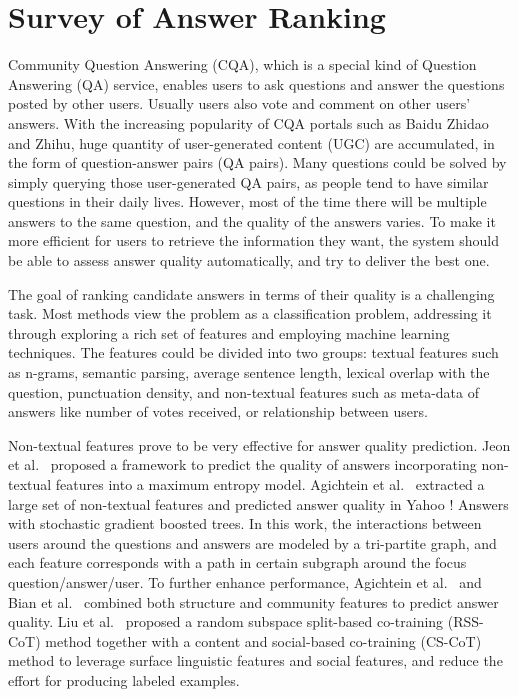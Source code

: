 \section{Survey of Answer Ranking}


Community Question Answering (CQA), which is a special kind of Question Answering (QA) service, enables users to ask questions and answer the questions posted by other users. Usually users also vote and comment on other users' answers. With the increasing popularity of CQA portals such as Baidu Zhidao and Zhihu, huge quantity of user-generated content (UGC) are accumulated, in the form of question-answer pairs (QA pairs). Many questions could be solved by simply querying those user-generated QA pairs, as people tend to have similar questions in their daily lives. However, most of the time there will be multiple answers to the same question, and the quality of the answers varies. To make it more efficient for users to retrieve the information they want, the system should be able to assess answer quality automatically, and try to deliver the best one.

The goal of ranking candidate answers in terms of their quality is a challenging task. Most methods view the problem as a classification problem, addressing it through exploring a rich set of features and employing machine learning techniques. The features could be divided into two groups: textual features such as n-grams, semantic parsing, average sentence length, lexical overlap with the question, punctuation density, and non-textual features such as meta-data of answers like number of votes received, or relationship between users.

Non-textual features prove to be very effective for answer quality prediction. Jeon et al.~ proposed a framework to predict the quality of answers incorporating non-textual features into a maximum entropy model. Agichtein et al.~ extracted a large set of non-textual features and predicted answer quality in Yahoo ! Answers with stochastic gradient boosted trees. In this work, the interactions between users around the questions and answers are modeled by a tri-partite graph, and each feature corresponds with a path in certain subgraph around the focus question/answer/user. To further enhance performance, Agichtein et al.~ and Bian et al.~ combined both structure and community features to predict answer quality. Liu et al.~ proposed a random subspace split-based co-training (RSS-CoT) method together with a content and social-based co-training (CS-CoT) method to leverage surface linguistic features and social features, and reduce the effort for producing labeled examples.

